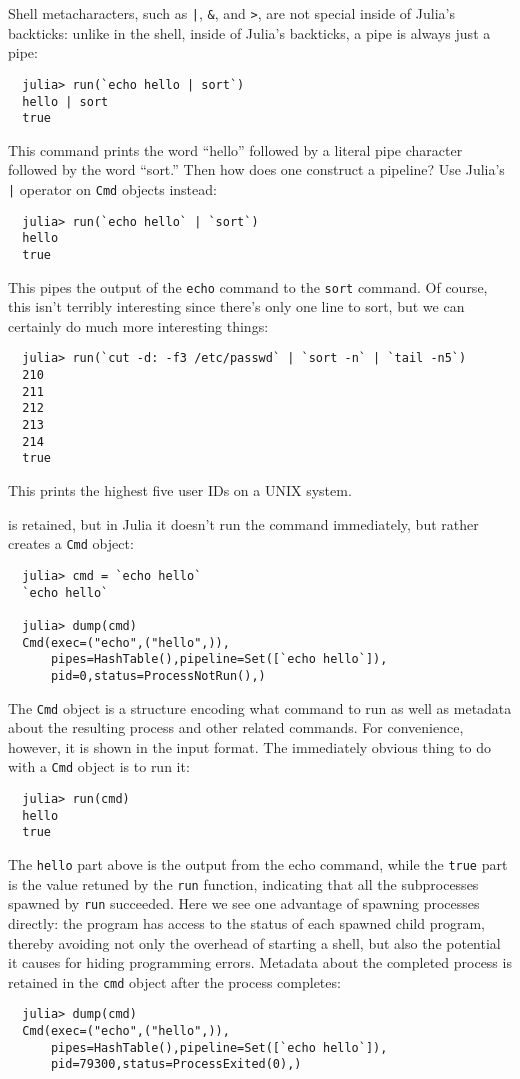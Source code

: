 \documentclass{article}
\begin{document}
Shell metacharacters, such as \texttt{|}, \verb|&|, and \verb|>|, are not special inside of Julia's backticks:
unlike in the shell, inside of Julia's backticks, a pipe is always just a pipe:
\begin{verbatim}
  julia> run(`echo hello | sort`)
  hello | sort
  true
\end{verbatim}
This command prints the word ``hello'' followed by a literal pipe character followed by the word ``sort.''
Then how does one construct a pipeline?
Use Julia's \texttt{|} operator on \verb|Cmd| objects instead:
\begin{verbatim}
  julia> run(`echo hello` | `sort`)
  hello
  true
\end{verbatim}
This pipes the output of the \verb|echo| command to the \verb|sort| command.
Of course, this isn't terribly interesting since there's only one line to sort, but we can certainly do much more interesting things:
\begin{verbatim}
  julia> run(`cut -d: -f3 /etc/passwd` | `sort -n` | `tail -n5`)
  210
  211
  212
  213
  214
  true
\end{verbatim}
This prints the highest five user IDs on a UNIX system.

\newpage
is retained, but in Julia it doesn't run the command immediately, but rather creates a \verb|Cmd| object:
\begin{verbatim}
  julia> cmd = `echo hello`
  `echo hello`

  julia> dump(cmd)
  Cmd(exec=("echo",("hello",)),
      pipes=HashTable(),pipeline=Set([`echo hello`]),
      pid=0,status=ProcessNotRun(),)
\end{verbatim}
The \verb|Cmd| object is a structure encoding what command to run as well as metadata about the resulting process and other related commands.
For convenience, however, it is shown in the input format.
The immediately obvious thing to do with a \verb|Cmd| object is to run it:
\begin{verbatim}
  julia> run(cmd)
  hello
  true
\end{verbatim}
The \verb|hello| part above is the output from the echo command, while the \verb|true| part is the value retuned by the \verb|run| function, indicating that all the subprocesses spawned by \verb|run| succeeded.
Here we see one advantage of spawning processes directly:
the program has access to the status of each spawned child program, thereby avoiding not only the overhead of starting a shell, but also the potential it causes for hiding programming errors.
Metadata about the completed process is retained in the \verb|cmd| object after the process completes:
\begin{verbatim}
  julia> dump(cmd)
  Cmd(exec=("echo",("hello",)),
      pipes=HashTable(),pipeline=Set([`echo hello`]),
      pid=79300,status=ProcessExited(0),)
\end{verbatim}
\end{document}
